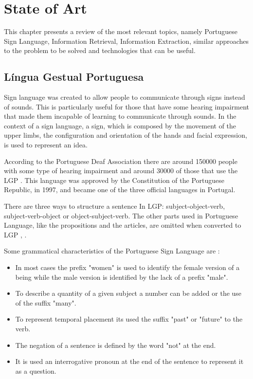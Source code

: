 
\chapter{State of Art}
\label{chap:Chapter2}

This chapter presents a review of the most relevant topics, namely Portuguese Sign Language, Information Retrieval, Information Extraction, similar approaches to the problem to be solved and technologies that can be useful.

\section{Língua Gestual Portuguesa}

Sign language was created to allow people to communicate through signs instead of sounds.
This is particularly useful for those that have some hearing impairment that made them incapable of learning to communicate through sounds.
In the context of a sign language, a sign, which is composed by the movement of the upper limbs, the configuration and orientation of the hands and facial expression, is used to represent an idea.

According to the Portuguese Deaf Association there are around 150000 people with some type of hearing impairment and around 30000 of those that use the \gls{LGP} \autocite{gaspar_2015}.
This language was approved by the Constitution of the Portuguese Republic, in 1997, and became one of the three official languages in Portugal.

There are three ways to structure a sentence In \gls{LGP}: subject-object-verb, subject-verb-object or object-subject-verb.
The other parts used in Portuguese Language, like the propositions and the articles, are omitted when converted to \gls{LGP} \autocite{bento_2013}, \autocite{martins_2011}.

Some grammatical characteristics of the Portuguese Sign Language are \autocite{bento_2013}:

\begin{itemize}
    \item In most cases the prefix "women" is used to identify the female version of a being while the male version is identified by the lack of a prefix "male".
    \item To describe a quantity of a given subject a number can be added or the use of the suffix "many".
    \item To represent temporal placement its used the suffix "past" or "future" to the verb.
    \item The negation of a sentence is defined by the word "not" at the end.
    \item It is used an interrogative pronoun at the end of the sentence to represent it as a question.
\end{itemize}


